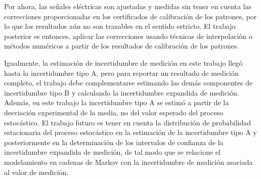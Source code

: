 Por ahora, las señales eléctricas son ajustadas y medidas sin tener en cuenta las correcciones proporcionadas en los
certificados de calibración de los patrones, por lo que los resultados aún no son trazables en el sentido estricto.
El trabajo posterior es entonces, aplicar las correcciones usando técnicas de interpolación o métodos numéricos a partir
de los resultados de calibración de los patrones.

Igualmente, la estimación de incertidumbre de medición en este trabajo llegó hasta la incertidumbre tipo A, pero para
reportar un resultado de medición completo, el trabajo debe complementarse estimando las demás componentes de incertidumbre
tipo B y calculando la incertidumbre expandida de medición.
Además, en este trabajo la incertidumbre tipo A se estimó a partir de la desviación experimental de la media, no del
valor esperado del proceso estocástico.
El trabajo futuro es tener en cuenta la distribución de probabilidad estacionaria del proceso estocástico en la estimación
de la incertidumbre tipo A y posteriormente en la determinación de los intervalos de confianza de la incertidumbre
expandida de medición, de tal modo que se relacione el modelamiento en cadenas de Markov con la incertidumbre de medición
asociada al valor de medición.